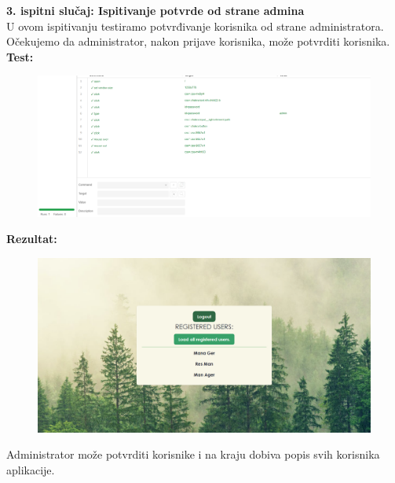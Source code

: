 \noindent \textbf{3. ispitni slučaj: Ispitivanje potvrde od strane admina}\\
U ovom ispitivanju testiramo potvrđivanje korisnika od strane administratora. Očekujemo da administrator, nakon prijave korisnika, može potvrditi korisnika. \\
\textbf{Test:}
\begin{figure}[H]
	\includegraphics[scale=0.4]{slike/test3sel.PNG} %
	\centering
\end{figure}
\noindent \textbf{Rezultat:}
\begin{figure}[H]
	\includegraphics[scale=0.5]{slike/test3selres.PNG} %
	\centering
\end{figure}
\noindent Administrator može potvrditi korisnike i na kraju dobiva popis svih korisnika aplikacije. \\

